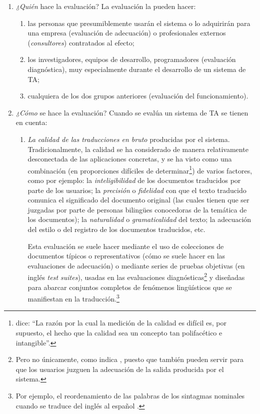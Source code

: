\begin{enumerate}
\item \emph{¿Quién} hace la evaluación? La evaluación la pueden hacer: \begin{enumerate} \item las personas que presumiblemente usarán el sistema o lo adquirirán para una empresa (evaluación de adecuación) o profesionales externos (\emph{consultores}) contratados al efecto; \item los investigadores, equipos de desarrollo, programadores (evaluación diagnóstica), muy especialmente durante el desarrollo de un sistema de TA; \item cualquiera de los dos grupos anteriores (evaluación del funcionamiento). \end{enumerate} \item \emph{¿Cómo} se hace la evaluación? Cuando se evalúa un sistema de TA se tienen en cuenta: \begin{enumerate} \item \emph{La calidad de las traducciones en bruto} producidas por el sistema. Tradicionalmente, la calidad se ha considerado de manera relativamente desconectada de las aplicaciones concretas, y se ha visto como una combinación (en proporciones difíciles de determinar\footnote{\citet{minnis94j} dice: ``La razón por la cual la medición de la calidad es difícil es, por supuesto, el hecho que la calidad sea un concepto tan polifacético e intangible''.}) de varios factores, como por ejemplo: la \emph{inteligibilidad} de los documentos traducidos por parte de los usuarios; la \emph{precisión} o \emph{fidelidad} con que el texto traducido comunica el significado del documento original (las cuales tienen que ser juzgadas por parte de personas bilingües conocedoras de la temática de los documentos); la \emph{naturalidad} o \emph{gramaticalidad} del texto; la adecuación del estilo o del registro de los documentos traducidos, etc. 

Esta evaluación se suele hacer mediante el uso de colecciones de documentos típicos o representativos (cómo se suele hacer en las evaluaciones de adecuación) o mediante series de pruebas objetivas (en inglés \emph{test suites}), usadas en las evaluaciones diagnósticas\footnote{Pero no únicamente, como indica \citet{lewis97j}, puesto que también pueden servir para que los usuarios juzguen la adecuación de la salida producida por el sistema.} y diseñadas para abarcar conjuntos completos de fenómenos lingüísticos que se manifiestan en la traducción.\footnote{Por ejemplo, el reordenamiento de las palabras de los sintagmas nominales cuando se traduce del inglés al español \citep{mira98j,forcada00p}.} 


\end{enumerate}
\end{enumerate}
